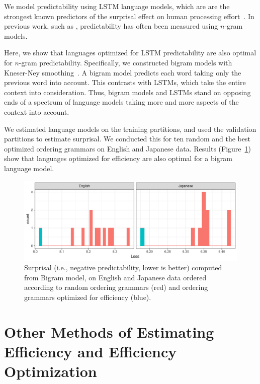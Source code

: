 \documentclass[10pt,twoside,lineno]{article}
\begin{document}
We model predictability using LSTM language models, which are are the strongest known predictors of the surprisal effect on human processing effort~\citep{frank2011insensitivity,goodkind2018predictive}.
In previous work, such as \cite{gildea2015human}, predictability has often been measured using $n$-gram models.

Here, we show that languages optimized for LSTM predictability are also optimal for $n$-gram predictability.
Specifically, we constructed bigram models with Kneser-Ney smoothing~\cite{kneser1995improved, chen1999empirical}.
A bigram model predicts each word taking only the previous word into account.
This contrasts with LSTMs, which take the entire context into consideration.
Thus, bigram models and LSTMs stand on opposing ends of a spectrum of language models taking more and more aspects of the context into account.

We estimated language models on the training partitions, and used the validation partitions to estimate surprisal.
We conducted this for ten random and the best optimized ordering grammars on English and Japanese data.
Results (Figure~\ref{fig:bigrams}) show that languages optimized for efficiency are also optimal for a bigram language model.

\begin{figure}
    \centering
    \includegraphics[scale=.6]{../results/bigrams/bigrams.pdf} 
	\caption{Surprisal (i.e., negative predictability, lower is better) computed from Bigram model, on English and Japanese data ordered according to random ordering grammars (red) and ordering grammars optimized for efficiency (blue).}
    \label{fig:bigrams}
\end{figure}



\section{Other Methods of Estimating Efficiency and Efficiency Optimization}
\end{document}
